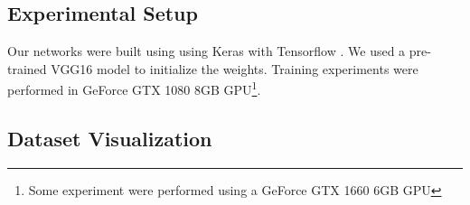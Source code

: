 \subsection{Experimental Setup}
\label{cap5_experimental_setup}

Our networks were built using using Keras \cite{chollet2015keras} with Tensorflow \cite{tensorflow2015-whitepaper}. 
We used a pre-trained VGG16 model to initialize the weights. 
Training experiments were performed in GeForce GTX 1080 8GB GPU\footnote{Some experiment were performed using a GeForce GTX 1660 6GB GPU}.

\subsection{Dataset Visualization}
\label{cap5_dataset_visualization}

